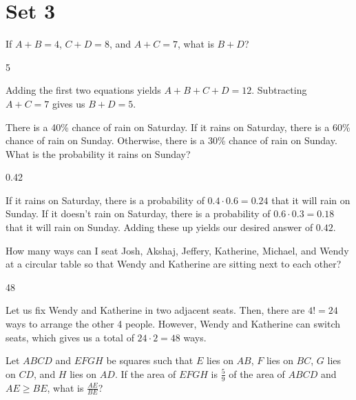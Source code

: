 \documentclass[11pt]{article}
\begin{document}
\newpage
\section*{Set 3}
\begin{problem}
If $A+B=4$, $C+D=8$, and $A+C=7$, what is $B+D$?
\end{problem}

\begin{answer}
5
\end{answer}

\begin{solution}
Adding the first two equations yields $A+B+C+D=12$. Subtracting $A+C=7$ gives us $B+D=\boxed{5}$.
\end{solution}

\begin{problem}
There is a 40\% chance of rain on Saturday. If it rains on Saturday, there is a 60\% chance of rain on Sunday. Otherwise, there is a 30\% chance of rain on Sunday. What is the probability it rains on Sunday?
\end{problem}

\begin{answer}
0.42
\end{answer}

\begin{solution}
If it rains on Saturday, there is a probability of $0.4 \cdot 0.6 =  0.24$ that it will rain on Sunday. If it doesn't rain on Saturday, there is a probability of $0.6 \cdot 0.3 = 0.18$ that it will rain on Sunday. Adding these up yields our desired answer of $\boxed{0.42}$.
\end{solution}

\begin{problem}
How many ways can I seat Josh, Akshaj, Jeffery, Katherine, Michael, and Wendy at a circular table so that Wendy and Katherine are sitting next to each other?
\end{problem}

\begin{answer}
48
\end{answer}

\begin{solution}
Let us fix Wendy and Katherine in two adjacent seats. Then, there are $4!=24$ ways to arrange the other 4 people. However, Wendy and Katherine can switch seats, which gives us a total of $24 \cdot 2 = \boxed{48}$ ways.
\end{solution}

\begin{problem}
Let $ABCD$ and $EFGH$ be squares such that $E$ lies on $AB$, $F$ lies on $BC$, $G$ lies on $CD$, and $H$ lies on $AD$. If the area of $EFGH$ is $\frac{5}{9}$ of the area of $ABCD$ and $AE \geq BE$, what is $\frac{AE}{BE}$?
\end{problem}
\end{document}

